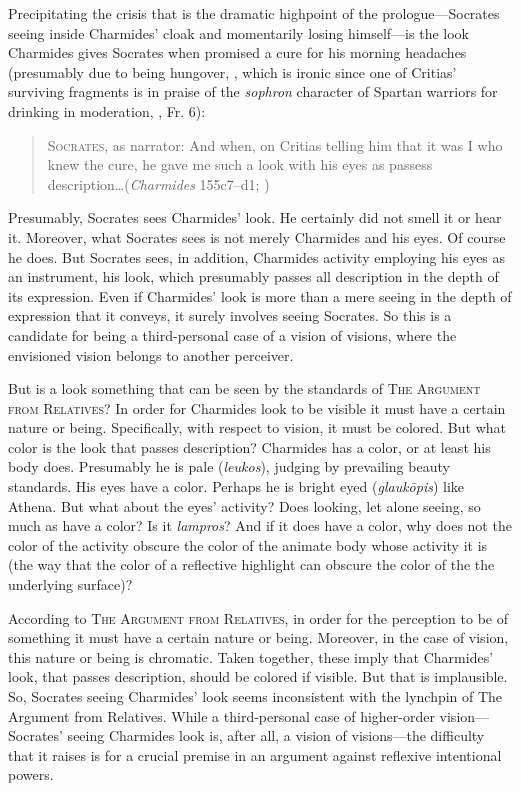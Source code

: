 Precipitating the crisis that is the dramatic highpoint of the prologue—Socrates seeing inside Charmides' cloak and momentarily losing himself—is the look Char\-mi\-des gives Socrates when promised a cure for his morning headaches (presumably due to being hungover, \citealt[41–2]{Hyland:1981aa}, which is ironic since one of Critias' surviving fragments is in praise of the \emph{sophron} character of Spartan warriors for drinking in moderation, \citealt{Diels:1974aa}, Fr. 6): 
\begin{quote}
	\textsc{Socrates}, as narrator: And when, on Critias telling him that it was I who knew the cure, he gave me such a look with his eyes as passess description\ldots (\emph{Charmides} 155c7–d1; \citealt{Lamb:1927qw})
\end{quote}
Presumably, Socrates sees Charmides' look. He certainly did not smell it or hear it. Moreover, what Socrates sees is not merely Charmides and his eyes. Of course he does. But Socrates sees, in addition, Charmides activity employing his eyes as an instrument, his look, which presumably passes all description in the depth of its expression. Even if Charmides' look is more than a mere seeing in the depth of expression that it conveys, it surely involves seeing Socrates. So this is a candidate for being a third-personal case of a vision of visions, where the envisioned vision belongs to another perceiver.

But is a look something that can be seen by the standards of \textsc{The Argument from Relatives}? In order for Charmides look to be visible it must have a certain nature or being. Specifically, with respect to vision, it must be colored. But what color is the look that passes description? Charmides has a color, or at least his body does. Presumably he is pale (\emph{leukos}), judging by prevailing beauty standards. His eyes have a color. Perhaps he is bright eyed (\emph{glaukōpis}) like Athena. But what about the eyes' activity? Does looking, let alone seeing, so much as have a color? Is it \emph{lampros}? And if it does have a color, why does not the color of the activity obscure the color of the animate body whose activity it is (the way that the color of a reflective highlight can obscure the color of the the underlying surface)?

According to \textsc{The Argument from Relatives}, in order for the perception to be of something it must have a certain nature or being. Moreover, in the case of vision, this nature or being is chromatic. Taken together, these imply that Charmides' look, that passes description, should be colored if visible. But that is implausible. So, Socrates seeing Charmides' look seems inconsistent with the lynchpin of The Argument from Relatives. While a third-personal case of higher-order vision—Socrates' seeing Charmides look is, after all, a vision of visions—the difficulty that it raises is for a crucial premise in an argument against reflexive intentional powers.

